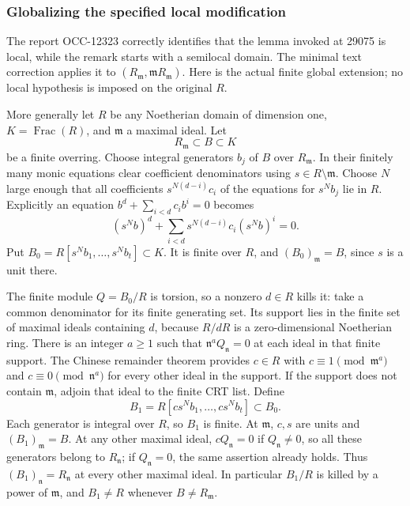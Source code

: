 \subsubsection{Globalizing the specified local modification}\label{globalizing-the-specified-local-modification}

The report OCC-12323 correctly identifies that the lemma invoked at 29075 is local, while the remark starts with a semilocal domain. The minimal text correction applies it to \((R_{\mathfrak m},\mathfrak mR_{\mathfrak m})\). Here is the actual finite global extension; no local hypothesis is imposed on the original \(R\).

More generally let \(R\) be any Noetherian domain of dimension one, \(K=\operatorname{Frac}(R)\), and \(\mathfrak m\) a maximal ideal. Let \[
 R_{\mathfrak m}\subset B\subset K
\] be a finite overring. Choose integral generators \(b_j\) of \(B\) over \(R_{\mathfrak m}\). In their finitely many monic equations clear coefficient denominators using \(s\in R\setminus\mathfrak m\). Choose \(N\) large enough that all coefficients \(s^{N(d-i)}c_i\) of the equations for \(s^Nb_j\) lie in \(R\). Explicitly an equation \(b^d+\sum_{i<d}c_i b^i=0\) becomes \[
 (s^Nb)^d+\sum_{i<d}s^{N(d-i)}c_i(s^Nb)^i=0.
\] Put \(B_0=R[s^Nb_1,\ldots,s^Nb_t]\subset K\). It is finite over \(R\), and \((B_0)_{\mathfrak m}=B\), since \(s\) is a unit there.

The finite module \(Q=B_0/R\) is torsion, so a nonzero \(d\in R\) kills it: take a common denominator for its finite generating set. Its support lies in the finite set of maximal ideals containing \(d\), because \(R/dR\) is a zero-dimensional Noetherian ring. There is an integer \(a\ge1\) such that \(\mathfrak n^a Q_{\mathfrak n}=0\) at each ideal in that finite support. The Chinese remainder theorem provides \(c\in R\) with \(c\equiv1\pmod{\mathfrak m^a}\) and \(c\equiv0\pmod{\mathfrak n^a}\) for every other ideal in the support. If the support does not contain \(\mathfrak m\), adjoin that ideal to the finite CRT list. Define \[
 B_1=R[c s^Nb_1,\ldots,c s^Nb_t]\subset B_0.
\] Each generator is integral over \(R\), so \(B_1\) is finite. At \(\mathfrak m\), \(c,s\) are units and \((B_1)_{\mathfrak m}=B\). At any other maximal ideal, \(cQ_{\mathfrak n}=0\) if \(Q_{\mathfrak n}\ne0\), so all these generators belong to \(R_{\mathfrak n}\); if \(Q_{\mathfrak n}=0\), the same assertion already holds. Thus \((B_1)_{\mathfrak n}=R_{\mathfrak n}\) at every other maximal ideal. In particular \(B_1/R\) is killed by a power of \(\mathfrak m\), and \(B_1\ne R\) whenever \(B\ne R_{\mathfrak m}\).

